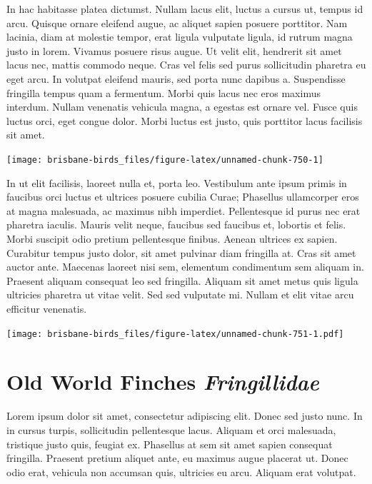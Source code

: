 \documentclass[]{book}
\let\origfigure\figure
\let\endorigfigure\endfigure
\renewenvironment{figure}[1][2] {
  \expandafter\origfigure\expandafter[H]
} {
  \endorigfigure
}
\begin{document}
In hac habitasse platea dictumst. Nullam lacus elit, luctus a cursus ut,
tempus id arcu. Quisque ornare eleifend augue, ac aliquet sapien posuere
porttitor. Nam lacinia, diam at molestie tempor, erat ligula vulputate
ligula, id rutrum magna justo in lorem. Vivamus posuere risus augue. Ut
velit elit, hendrerit sit amet lacus nec, mattis commodo neque. Cras vel
felis sed purus sollicitudin pharetra eu eget arcu. In volutpat eleifend
mauris, sed porta nunc dapibus a. Suspendisse fringilla tempus quam a
fermentum. Morbi quis lacus nec eros maximus interdum. Nullam venenatis
vehicula magna, a egestas est ornare vel. Fusce quis luctus orci, eget
congue dolor. Morbi luctus est justo, quis porttitor lacus facilisis sit
amet.

\begin{figure}
\texttt{[image: brisbane-birds\_files/figure-latex/unnamed-chunk-750-1]} \caption{insert figure caption}\label{fig:unnamed-chunk-750}
\end{figure}

In ut elit facilisis, laoreet nulla et, porta leo. Vestibulum ante ipsum
primis in faucibus orci luctus et ultrices posuere cubilia Curae;
Phasellus ullamcorper eros at magna malesuada, ac maximus nibh
imperdiet. Pellentesque id purus nec erat pharetra iaculis. Mauris velit
neque, faucibus sed faucibus et, lobortis et felis. Morbi suscipit odio
pretium pellentesque finibus. Aenean ultrices ex sapien. Curabitur
tempus justo dolor, sit amet pulvinar diam fringilla at. Cras sit amet
auctor ante. Maecenas laoreet nisi sem, elementum condimentum sem
aliquam in. Praesent aliquam consequat leo sed fringilla. Aliquam sit
amet metus quis ligula ultricies pharetra ut vitae velit. Sed sed
vulputate mi. Nullam et elit vitae arcu efficitur venenatis.

\begin{figure}
\centering
\texttt{[image: brisbane-birds\_files/figure-latex/unnamed-chunk-751-1.pdf]}
\caption{\label{fig:unnamed-chunk-751}insert figure caption}
\end{figure}

\chapter{\texorpdfstring{Old World Finches
\emph{Fringillidae}}{Old World Finches Fringillidae}}\label{old-world-finches-fringillidae}

Lorem ipsum dolor sit amet, consectetur adipiscing elit. Donec sed justo
nunc. In in cursus turpis, sollicitudin pellentesque lacus. Aliquam et
orci malesuada, tristique justo quis, feugiat ex. Phasellus at sem sit
amet sapien consequat fringilla. Praesent pretium aliquet ante, eu
maximus augue placerat ut. Donec odio erat, vehicula non accumsan quis,
ultricies eu arcu. Aliquam erat volutpat.
\end{document}
